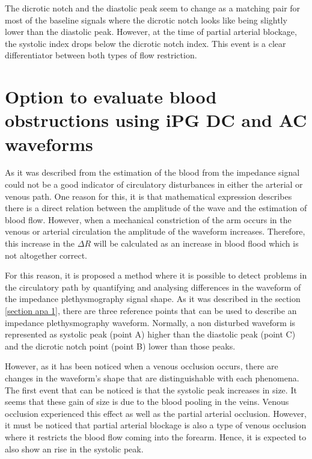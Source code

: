 The dicrotic notch and the diastolic peak seem to change as a matching pair for most of the baseline signals where the dicrotic notch looks like being slightly lower than the diastolic peak. However, at the time of partial arterial blockage, the systolic index drops below the dicrotic notch index. This event is a clear differentiator between both types of flow restriction.

\section{Option to evaluate blood obstructions using iPG DC and AC waveforms}  %
\label{section discussion 3}
As it was described from the estimation of the blood from the impedance signal could not be a good indicator of circulatory disturbances in either the arterial or venous path. One reason for this, it is that mathematical expression describes there is a direct relation between the amplitude of the wave and the estimation of blood flow. However, when a mechanical constriction of the arm occurs in the venous or arterial circulation the amplitude of the waveform increases. Therefore, this increase in the $\Delta R$ will be calculated as an increase in blood flood which is not altogether correct. 

For this reason, it is proposed a method where it is possible to detect problems in the circulatory path by quantifying and analysing differences in the waveform of the impedance plethysmography signal shape. As it was described in the section \ref{section apa 1}, there are three reference points that can be used to describe an impedance plethysmography waveform. Normally, a non disturbed waveform is represented as systolic peak (point A) higher than the diastolic peak (point C) and the dicrotic notch point (point B) lower than those peaks. 

However, as it has been noticed when a venous occlusion occurs, there are changes in the waveform's shape that are distinguishable with each phenomena. The first event that can be noticed is that the systolic peak increases in size. It seems that these gain of size is due to the blood pooling in the veins. Venous occlusion experienced this effect as well as the partial arterial occlusion. However, it must be noticed that partial arterial blockage is also a type of venous occlusion where it restricts the blood flow coming into the forearm. Hence, it is expected to also show an rise in the systolic peak. 

